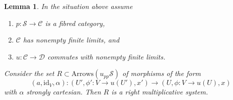 \documentclass{stacks-project}
\theoremstyle{plain}
\newtheorem{lemma}[subsection]{Lemma}
\theoremstyle{definition}
\theoremstyle{remark}
\numberwithin{equation}{subsection}
\begin{document}
\begin{lemma}
\label{lemma-right-multiplicative-system}
In the situation above assume
\begin{enumerate}
\item $p : \mathcal{S} \to \mathcal{C}$ is a fibred category,
\item $\mathcal{C}$ has nonempty finite limits, and
\item $u : \mathcal{C} \to \mathcal{D}$ commutes with nonempty finite limits.
\end{enumerate}
Consider the set $R \subset \text{Arrows}(u_{pp}\mathcal{S})$ of morphisms
of the form
$$
(a, \text{id}_V, \alpha) :
(U', \phi' : V \to u(U'), x')
\longrightarrow
(U, \phi : V \to u(U), x)
$$
with $\alpha$ strongly cartesian. Then $R$ is a right multiplicative system.
\end{lemma}
\end{document}
